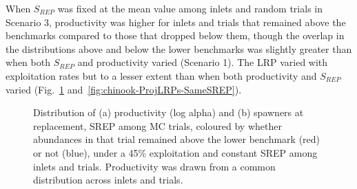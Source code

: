\documentclass[11pt]{book}
\begin{document}
When \(S_{REP}\) was fixed at the mean value among inlets and random trials in Scenario 3, productivity was higher for inlets and trials that remained above the benchmarks compared to those that dropped below them, though the overlap in the distributions above and below the lower benchmarks was slightly greater than when both \(S_{REP}\) and productivity varied (Scenario 1). The LRP varied with exploitation rates but to a lesser extent than when both productivity and \(S_{REP}\) varied (Fig.~\ref{fig:chinook-SRHistSameSREP} and~\ref{fig:chinook-ProjLRPs-SameSREP}).
\begin{figure}[htb]

{\centering {} 

}

\caption{Distribution of (a) productivity (log alpha) and (b) spawners at replacement, SREP among MC trials, coloured by whether abundances in that trial remained above the lower benchmark (red) or not (blue), under a 45\% exploitation and constant SREP among inlets and trials. Productivity was drawn from a common distribution across inlets and trials. }\label{fig:chinook-SRHistSameSREP}
\end{figure}
\end{document}

